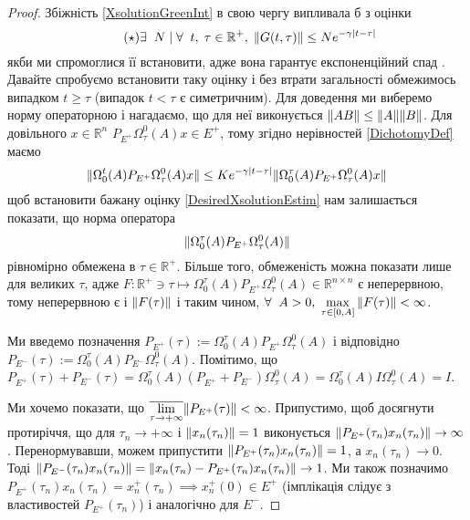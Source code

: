 \documentclass[14pt]{extarticle} %
\let\oldforall\forall
\renewcommand{\forall}{\oldforall\;}
\let\oldexists\exists
\renewcommand{\exists}{\oldexists\;}
\theoremstyle{remark}
\begin{document}
\begin{proof}
	Збіжність \ref{XsolutionGreenInt} в свою чергу випливала б з оцінки
	\[\label{DesiredXsolutionEstim}
	\tag{$\star$}\exists N\mid \forall t,\;\tau\in\mathbb{R}^+,\;\mynorm{G(t,\tau)}\leq Ne^{-\gamma\myabs{t-\tau}}\]
	якби ми спромоглися її встановити, адже вона гарантує експоненційний спад
	. Давайте спробуємо встановити таку оцінку і без втрати загальності обмежимось випадком $t\geq\tau$ (випадок
	$t<\tau$ є симетричним). Для доведення ми виберемо норму операторною 
	і нагадаємо, що для неї виконується $\|AB\|\leq\|A\|\|
	B\|$.
	Для довільного $x\in\mathbb{R}^n$ $P_{E^+}\Omega^0_{\tau}(A)x\in E^+$, тому згідно нерівностей \ref{DichotomyDef}
	маємо
	\[\|\Omega_0^t(A) P_{E^+} \Omega^0_{\tau}(A)x\|\leq Ke^{-\gamma\left|t-\tau\right|}\|\Omega_0^{\tau}(A) P_{E^+} \Omega^0_{\tau}(A)x\|\]
	щоб встановити бажану оцінку \ref{DesiredXsolutionEstim} нам залишається показати, що норма оператора 
	\[\|\Omega_0^{\tau}(A) P_{E^+} \Omega^0_{\tau}(A)\|\]
	рівномірно обмежена в $\tau\in\mathbb{R}^+$. Більше того, обмеженість можна показати лише для великих $\tau$, адже 
	$F:\mathbb{R^+}\ni \tau\mapsto\Omega_0^{\tau}(A) P_{E^+} \Omega^0_{\tau}(A)\in\mathbb{R}^{n\times n}
	$ є неперервною, тому неперервною є і $\|F(\tau)\|$ і
	таким чином, $\forall A>0,\;\max_{\tau\in[0,A]}\mynorm{F(\tau)}<\infty$. 

	Ми введемо позначення $P_{E^+}(\tau):=	\Omega_0^{\tau}(A) P_{E^+} \Omega^0_{\tau}(A)$ і відповідно 
	$P_{E^-}(\tau):=\Omega_0^{\tau}(A) P_{E^-} \Omega^0_{\tau}(A)$. Помітимо, що $P_{E^+}(\tau)+P_{E^-}(\tau)=
	\Omega_0^{\tau}(A) (P_{E^+}+P_{E^-}) \Omega^0_{\tau}(A)=\Omega_0^{\tau}(A)I\Omega^0_{\tau}(A)=I$. 
	
	Ми хочемо показати,
	що $\overline{\lim_{\tau\to+\infty}}\mynorm{P_{E^+}(\tau)}<\infty$. Припустимо, щоб досягнути протиріччя, що для
	$\tau_n\to+\infty$ і $\|x_n(\tau_n)\|=1$ виконується $\|P_{E^+}(\tau_n)x_n(\tau_n)\|\to\infty$. Перенормувавши, можем припустити
	$\|P_{E^+}(\tau_n)x_n(\tau_n)\|=1$, а $x_n(\tau_n)\to 0$. 
	Тоді $\|P_{E^-}(\tau_n)x_n(\tau_n)\|=\|x_n(\tau_n)-P_{E^+}(\tau_n)x_n(\tau_n)\|\to 1$. Ми також
	позначимо $P_{E^+}(\tau_n)x_n(\tau_n)=x^+_n(\tau_n)\implies x^+_n(0)\in E^+$ (імплікація слідує
	з властивостей $P_{E^+}(\tau_n)$) і аналогічно для $E^-$.


\end{proof}
\end{document}
